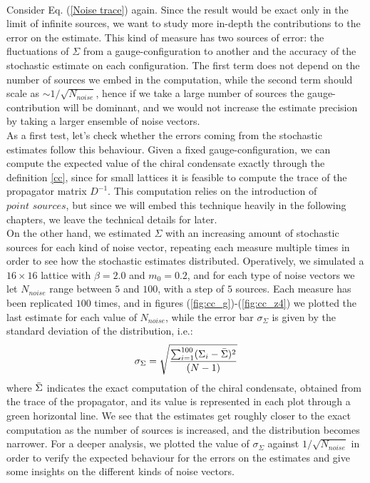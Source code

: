 \\ Consider Eq. (\ref{Noise trace}) again. Since the result would be exact only in the limit of infinite sources, we want to study more in-depth the contributions to the error on the estimate. This kind of measure has two sources of error: the fluctuations of $\Sigma$ from a gauge-configuration to another and the accuracy of the stochastic estimate on each configuration. The first term does not depend on the number of sources we embed in the computation, while the second term should scale as $\sim 1/\sqrt{N_{noise}}$, hence if we take a large number of sources the gauge-contribution will be dominant, and we would not increase the estimate precision by taking a larger ensemble of noise vectors.
\\ As a first test, let's check whether the errors coming from the stochastic estimates follow this behaviour. Given a fixed gauge-configuration, we can compute the expected value of the chiral condensate exactly through the definition \eqref{cc}, since for small lattices it is feasible to compute the trace of the propagator matrix $D^{-1}$.
This computation relies on the introduction of $\textit{point sources}$, but since we will embed this technique heavily in the following chapters, we leave the technical details for later.
\\ On the other hand, we estimated $\Sigma$ with an increasing amount of stochastic sources for each kind of noise vector, repeating each measure multiple times in order to see how the stochastic estimates distributed. Operatively, we simulated a $16 \times 16$ lattice with $\beta = 2.0$ and $m_0 = 0.2$, and for each type of noise vectors we let $N_{noise}$ range between $5$ and $100$, with a step of $5$ sources. Each measure has been replicated $100$ times, and in figures (\ref{fig:cc_g})-(\ref{fig:cc_z4}) we plotted the last estimate for each value of $N_{noise}$, while the error bar $\sigma_\Sigma$ is given by the standard deviation of the distribution, i.e.:
\begin{equation}
\sigma_{\Sigma} = \sqrt{\frac{\sum_{i = 1}^{100} (\Sigma_i - \Bar{\Sigma})^2}{(N-1)}}     
\end{equation}
where $\Bar{\Sigma}$ indicates the exact computation of the chiral condensate, obtained from the trace of the propagator, and its value is represented in each plot through a green horizontal line.
We see that the estimates get roughly closer to the exact computation as the number of sources is increased, and the distribution becomes narrower. For a deeper analysis, we plotted the value of $\sigma_\Sigma$ against $1/\sqrt{N_{noise}}$ in order to verify the expected behaviour for the errors on the estimates and give some insights on the different kinds of noise vectors.
